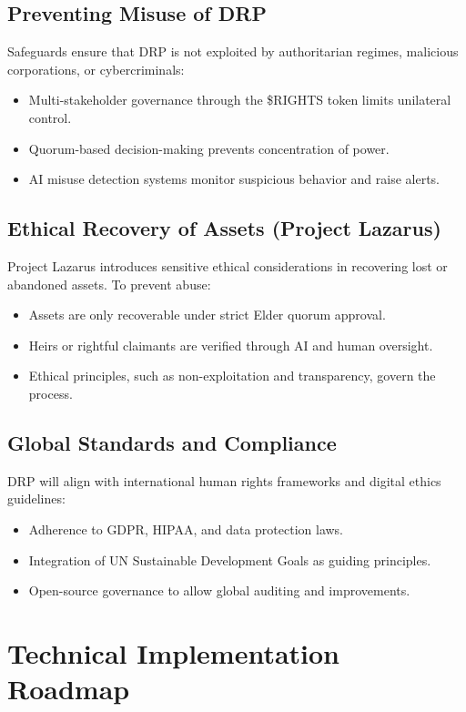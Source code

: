 \documentclass[11pt,a4paper]{article}
\begin{document}
\subsection{Preventing Misuse of DRP}
Safeguards ensure that DRP is not exploited by authoritarian regimes, malicious corporations, or cybercriminals:
\begin{itemize}
    \item Multi-stakeholder governance through the \$RIGHTS token limits unilateral control.
    \item Quorum-based decision-making prevents concentration of power.
    \item AI misuse detection systems monitor suspicious behavior and raise alerts.
\end{itemize}

\subsection{Ethical Recovery of Assets (Project Lazarus)}
Project Lazarus introduces sensitive ethical considerations in recovering lost or abandoned assets. To prevent abuse:
\begin{itemize}
    \item Assets are only recoverable under strict Elder quorum approval.
    \item Heirs or rightful claimants are verified through AI and human oversight.
    \item Ethical principles, such as non-exploitation and transparency, govern the process.
\end{itemize}

\subsection{Global Standards and Compliance}
DRP will align with international human rights frameworks and digital ethics guidelines:
\begin{itemize}
    \item Adherence to GDPR, HIPAA, and data protection laws.
    \item Integration of UN Sustainable Development Goals as guiding principles.
    \item Open-source governance to allow global auditing and improvements.
\end{itemize}

\section{Technical Implementation Roadmap}
\end{document}
